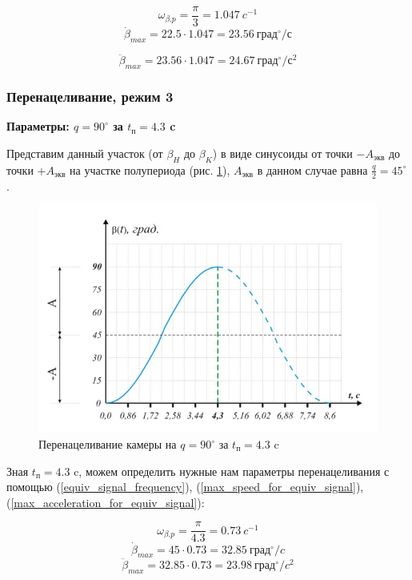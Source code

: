 $$
    \omega_{\beta.p} = \frac{\pi}{3} = 1.047 ~c^{-1}
$$
$$
    \dot{\beta}_{max} = 22.5 \cdot 1.047 = 23.56 ~\text{град}^{\circ} / \text{с}
$$

$$
    \ddot{\beta}_{max} = 23.56 \cdot 1.047 = 24.67 ~\text{град}^{\circ} / \text{с}^{2}
$$

\subsubsection{Перенацеливание, режим 3}

\textbf{Параметры: $q = 90^{\circ}$ за $t_\text{п} = 4.3$ c}

Представим данный участок (от $\beta_{H}$ до $\beta_{K}$) в виде синусоиды от точки
$-A_\text{экв}$ до точки $+A_\text{экв}$ на участке полупериода
(рис. \ref{retarget_90grad_4,3sec}), $A_\text{экв}$ в данном случае
равна $\frac{q}{2} = 45^{\circ}$.

\begin{figure}[ht!]
    \centering
    \includegraphics[keepaspectratio]{./src/pictures/retarget_equivalent_input_signals/90grad_4,3sec}
    \caption{Перенацеливание камеры на $q = 90^{\circ}$ за $t_\text{п} = 4.3$ c}
    \label{retarget_90grad_4,3sec}
\end{figure}

Зная $t_{\text{п} } = 4.3$ c, можем определить нужные нам параметры перенацеливания
с помощью (\ref{equiv_signal_frequency}),
(\ref{max_speed_for_equiv_signal}),
(\ref{max_acceleration_for_equiv_signal}):

$$
    \omega_{\beta.p} = \frac{\pi}{4.3} = 0.73 ~c^{-1}
$$
$$
    \dot{\beta}_{max} = 45 \cdot 0.73 = 32.85 ~\text{град}^{\circ} / c
$$
$$
    \ddot{\beta}_{max} = 32.85 \cdot 0.73 = 23.98 ~\text{град}^{\circ} / c^{2}
$$

\endinput

